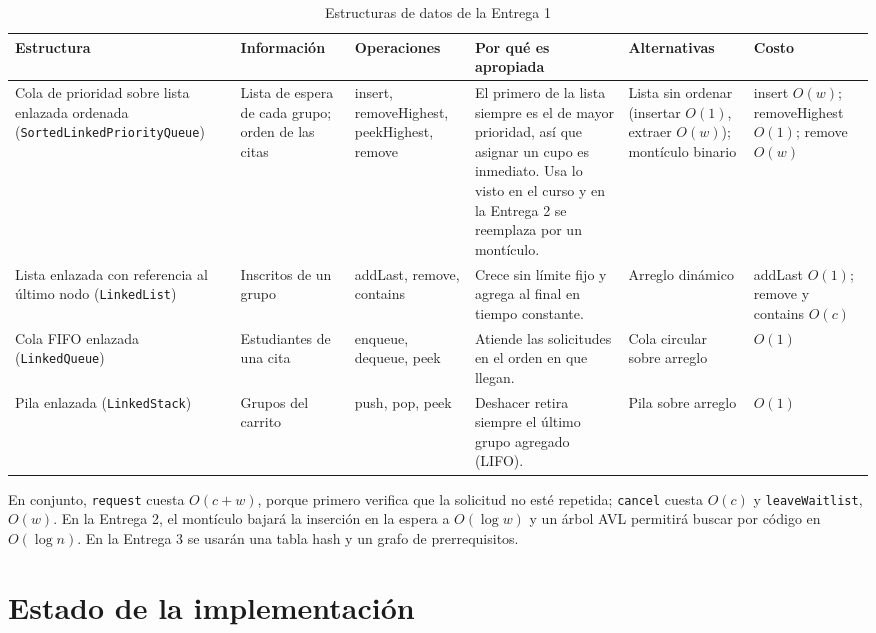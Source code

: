 \documentclass[conference]{IEEEtran}
\begin{document}
\begin{table}[htbp]
\caption{Estructuras de datos de la Entrega 1}
\label{tab:ed}
\centering
\footnotesize
\setlength{\tabcolsep}{3pt}
\begin{tabular}{@{}p{2.6cm} p{2.6cm} p{2.3cm} p{4.3cm} p{2.8cm} p{2.4cm}@{}}
\toprule
\textbf{Estructura} & \textbf{Información} & \textbf{Operaciones} & \textbf{Por qué es apropiada} & \textbf{Alternativas} & \textbf{Costo} \\
\midrule
Cola de prioridad sobre lista enlazada ordenada (\texttt{SortedLinked}\allowbreak\texttt{PriorityQueue}) & Lista de espera de cada grupo; orden de las citas & insert, removeHighest, peekHighest, remove & El primero de la lista siempre es el de mayor prioridad, así que asignar un cupo es inmediato. Usa lo visto en el curso y en la Entrega 2 se reemplaza por un montículo. & Lista sin ordenar (insertar $O(1)$, extraer $O(w)$); montículo binario & insert $O(w)$; removeHighest $O(1)$; remove $O(w)$ \\
Lista enlazada con referencia al último nodo (\texttt{LinkedList}) & Inscritos de un grupo & addLast, remove, contains & Crece sin límite fijo y agrega al final en tiempo constante. & Arreglo dinámico & addLast $O(1)$; remove y contains $O(c)$ \\
Cola FIFO enlazada (\texttt{LinkedQueue}) & Estudiantes de una cita & enqueue, dequeue, peek & Atiende las solicitudes en el orden en que llegan. & Cola circular sobre arreglo & $O(1)$ \\
Pila enlazada (\texttt{LinkedStack}) & Grupos del carrito & push, pop, peek & Deshacer retira siempre el último grupo agregado (LIFO). & Pila sobre arreglo & $O(1)$ \\
\bottomrule
\end{tabular}
\end{table}

En conjunto, \texttt{request} cuesta $O(c + w)$, porque primero verifica que la solicitud no esté repetida; \texttt{cancel} cuesta $O(c)$ y \texttt{leaveWaitlist}, $O(w)$. En la Entrega 2, el montículo bajará la inserción en la espera a $O(\log w)$ y un árbol AVL permitirá buscar por código en $O(\log n)$. En la Entrega 3 se usarán una tabla hash y un grafo de prerrequisitos.


\section{Estado de la implementación}
\end{document}
